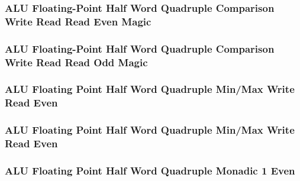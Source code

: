 

\subsubsection[{\small ALU Floating-Point Half Word Quadruple Comparison Write Read Read Even Magic}]{ALU Floating-Point Half Word Quadruple Comparison Write Read Read Even Magic} \label{sec:format-ALU-FHQCWRRE.M}



\subsubsection[{\small ALU Floating-Point Half Word Quadruple Comparison Write Read Read Odd Magic}]{ALU Floating-Point Half Word Quadruple Comparison Write Read Read Odd Magic} \label{sec:format-ALU-FHQCWRRO.M}



\subsubsection[{\small ALU Floating Point Half Word Quadruple Min/Max Write Read Even}]{ALU Floating Point Half Word Quadruple Min/Max Write Read Even} \label{sec:format-ALU-FHQMMWRE}



\subsubsection[{\small ALU Floating Point Half Word Quadruple Min/Max Write Read Even}]{ALU Floating Point Half Word Quadruple Min/Max Write Read Even} \label{sec:format-ALU-FHQMMWRO}



\subsubsection[{\small ALU Floating Point Half Word Quadruple Monadic 1 Even}]{ALU Floating Point Half Word Quadruple Monadic 1 Even} \label{sec:format-ALU-FHQMO1E}


